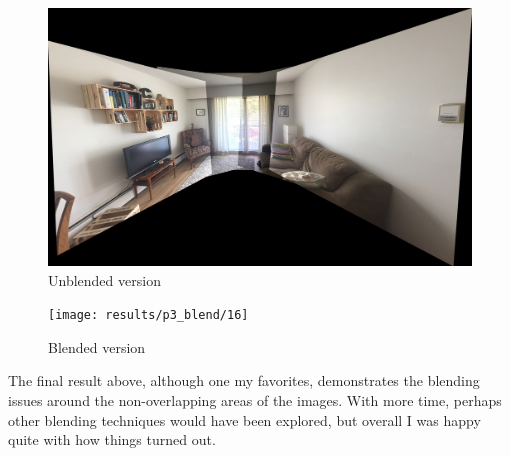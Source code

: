 \documentclass[]{article}
\begin{document}
\begin{figure}[!h]
	\includegraphics[scale=0.12]{results/p3_noblend/16}
	\centering
	\caption{Unblended version}
\end{figure}
\vspace{100mm}
\begin{figure}[!h]
	\texttt{[image: results/p3\_blend/16]}
	\centering
	\caption{Blended version}
\end{figure}

The final result above, although one my favorites, demonstrates the blending issues around the non-overlapping areas of the images. With more time, perhaps other blending techniques would have been explored, but overall I was happy quite with how things turned out.
\end{document}
